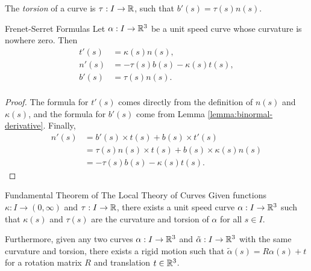 \begin{defn}
    The \emph{torsion} of a curve is $\tau: I \to \mathbb{R}$, such that $b'(s) = \tau(s)n(s)$.
\end{defn}

\begin{thm}{Frenet-Serret Formulas}\label{thm:frenet-serret}\proofbreak
    Let $\alpha: I \to \mathbb{R}^3$ be a unit speed curve whose curvature is nowhere zero. Then
    \begin{align*}
        t'(s) &= \kappa(s)n(s), \\
        n'(s) &= -\tau(s)b(s) - \kappa(s)t(s), \\
        b'(s) &= \tau(s)n(s). \\
    \end{align*}
\end{thm}

\begin{proof}
    The formula for $t'(s)$ comes directly from the definition of $n(s)$ and $\kappa(s)$, and the formula for $b'(s)$ come from Lemma \ref{lemma:binormal-derivative}. Finally,
    \begin{align*}
        n'(s) &= b'(s) \times t(s) + b(s) \times t'(s) \\
        &= \tau(s)n(s) \times t(s) + b(s) \times \kappa(s)n(s) \\
        &= -\tau(s)b(s) - \kappa(s)t(s).
    \end{align*}
\end{proof}

\begin{thm}{Fundamental Theorem of The Local Theory of Curves}\label{thm:local-theory-curves}\proofbreak
    Given functions $\kappa: I \to (0, \infty)$ and $\tau: I \to \mathbb{R}$, there exists a unit speed curve $\alpha: I \to \mathbb{R}^3$ such that $\kappa(s)$ and $\tau(s)$ are the curvature and torsion of $\alpha$ for all $s \in I$.

    Furthermore, given any two curves $\alpha: I \to \mathbb{R}^3$ and $\tilde{\alpha}: I \to \mathbb{R}^3$ with the same curvature and torsion, there exists a rigid motion such that $\tilde{\alpha}(s) = R\alpha(s) + t$ for a rotation matrix $R$ and translation $t \in \mathbb{R}^3$.
\end{thm}

